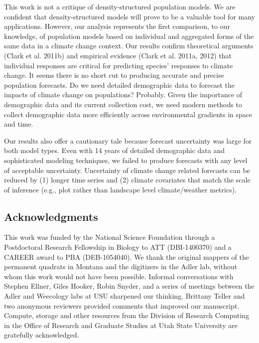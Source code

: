 \documentclass[12pt,]{article}
\begin{document}
This work is not a critique of density-structured population models. We
are confident that density-structured models will prove to be a valuable
tool for many applications. However, our analysis represents the first
comparison, to our knowledge, of population models based on individual
and aggregated forms of the same data in a climate change context. Our
results confirm theoretical arguments (Clark et al. 2011b) and empirical
evidence (Clark et al. 2011a, 2012) that individual responses are
critical for predicting species' responses to climate change. It seems
there is no short cut to producing accurate and precise population
forecasts. Do we need detailed demographic data to forecast the impacts
of climate change on populations? Probably. Given the importance of
demographic data and its current collection cost, we need modern methods
to collect demographic data more efficiently across environmental
gradients in space and time.

Our results also offer a cautionary tale because forecast uncertainty
was large for both model types. Even with 14 years of detailed
demographic data and sophisticated modeling techniques, we failed to
produce forecasts with any level of acceptable uncertainty. Uncertainty
of climate change related forecasts can be reduced by (1) longer time
series and (2) climate covariates that match the scale of inference
(e.g., plot rather than landscape level climate/weather metrics).

\subsection{Acknowledgments}\label{acknowledgments}

This work was funded by the National Science Foundation through a
Postdoctoral Research Fellowship in Biology to ATT (DBI-1400370) and a
CAREER award to PBA (DEB-1054040). We thank the original mappers of the
permanent quadrats in Montana and the digitizers in the Adler lab,
without whom this work would not have been possible. Informal
conversations with Stephen Ellner, Giles Hooker, Robin Snyder, and a
series of meetings between the Adler and Weecology labs at USU sharpened
our thinking. Brittany Teller and two anonymous reviewers provided
comments that improved our manuscript. Compute, storage and other
resources from the Division of Research Computing in the Office of
Research and Graduate Studies at Utah State University are gratefully
acknowledged.

\pagebreak{}
\end{document}
